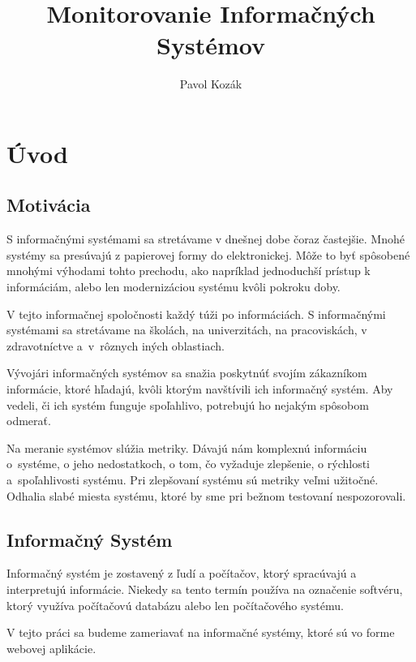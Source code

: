 \documentclass[a4paper, usesections, upjsfrontpage, disablespecwarning, thesismargins, thesislinespacing]{rnthesissvk}
\title{Monitorovanie Informačných Systémov}
\author{Pavol Kozák}
\begin{document}
\maketitle
\newpage

\setcounter{tocdepth}{3}
\tableofcontents

\newpage
\section{Úvod}

\subsection{Motivácia}

S informačnými systémami sa stretávame v dnešnej dobe čoraz častejšie. 
Mnohé systémy sa presúvajú z papierovej formy do elektronickej.
Môže to byť spôsobené mnohými výhodami tohto prechodu, ako napríklad jednoduchší prístup k informáciám, alebo len modernizáciou systému kvôli pokroku doby.

V tejto informačnej spoločnosti každý túži po informáciách.
S informačnými systémami sa stretávame na školách, na univerzitách, na pracoviskách, v zdravot\-níc\-tve a~v~rôznych iných oblastiach.

Vývojári informačných systémov sa snažia poskytnúť svojím zákazníkom informácie, ktoré hľadajú, kvôli ktorým navštívili ich informačný systém.
Aby vedeli, či ich systém funguje spoľahlivo, potrebujú ho nejakým spôsobom odmerať.

Na meranie systémov slúžia metriky.
Dávajú nám komplexnú informáciu o~systéme, o jeho nedostatkoch, o tom, čo vyžaduje zlepšenie, o rýchlosti a~spoľahli\-vos\-ti systému.
Pri zlepšovaní systému sú metriky veľmi užitočné.
Odhalia slabé miesta systému, ktoré by sme pri bežnom testovaní nespozorovali.

\subsection{Informačný Systém}

Informačný systém je zostavený z ľudí a počítačov, ktorý spracúvajú a interpretujú informácie.
Niekedy sa tento termín používa na označenie softvéru, ktorý využíva počítačovú databázu alebo len počítačového systému.

V tejto práci sa budeme zameriavať na informačné systémy, ktoré sú vo forme webovej aplikácie.
\end{document}
